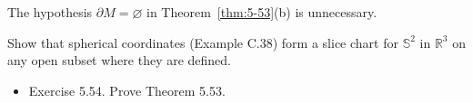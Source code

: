 \begin{remark}
\label{rem:5-36-extra-5}




The hypothesis $\partial M=\varnothing$ in Theorem~\ref{thm:5-53}(b) is
unnecessary.
\end{remark}

\begin{exercise}
\label{exer:5-10}


Show that spherical coordinates (Example C.38) form a slice chart for ${\mathbb{S}}^{2}$ in ${\mathbb{R}}^{3}$ on any open subset where they are defined.
\end{exercise}

\begin{exercise}
\label{exer:5-54}


\begin{itemize}
\item Exercise 5.54. Prove Theorem 5.53.
\end{itemize}
\end{exercise}
